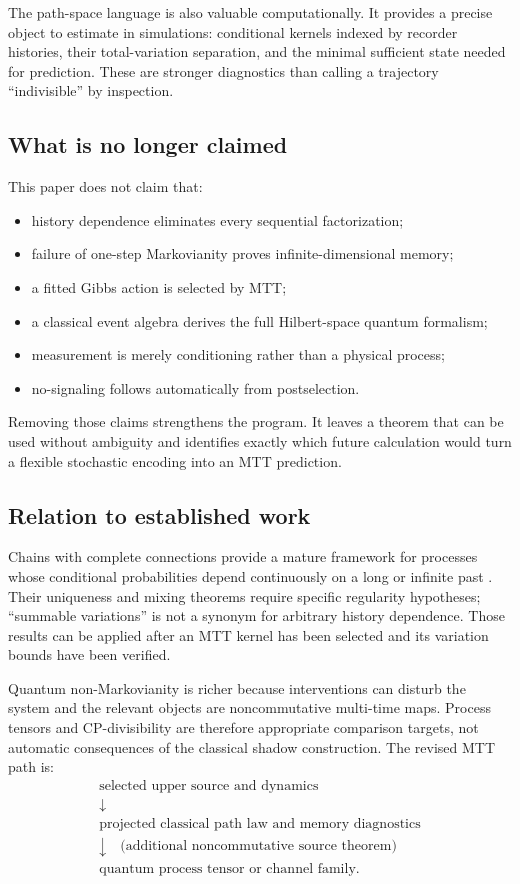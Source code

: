 \documentclass[11pt]{article}
\theoremstyle{definition}
\theoremstyle{remark}
\begin{document}
The path-space language is also valuable computationally.  It provides a
precise object to estimate in simulations: conditional kernels indexed by
recorder histories, their total-variation separation, and the minimal
sufficient state needed for prediction.  These are stronger diagnostics than
calling a trajectory ``indivisible'' by inspection.

\subsection{What is no longer claimed}

This paper does not claim that:
\begin{itemize}
\item history dependence eliminates every sequential factorization;
\item failure of one-step Markovianity proves infinite-dimensional memory;
\item a fitted Gibbs action is selected by MTT;
\item a classical event algebra derives the full Hilbert-space quantum
  formalism;
\item measurement is merely conditioning rather than a physical process;
\item no-signaling follows automatically from postselection.
\end{itemize}

Removing those claims strengthens the program.  It leaves a theorem that can
be used without ambiguity and identifies exactly which future calculation
would turn a flexible stochastic encoding into an MTT prediction.

\subsection{Relation to established work}

Chains with complete connections provide a mature framework for processes
whose conditional probabilities depend continuously on a long or infinite
past \cite{fernandez2005,johansson2003}.  Their uniqueness and mixing theorems
require specific regularity hypotheses; ``summable variations'' is not a
synonym for arbitrary history dependence.  Those results can be applied after
an MTT kernel has been selected and its variation bounds have been verified.

Quantum non-Markovianity is richer because interventions can disturb the
system and the relevant objects are noncommutative multi-time maps.  Process
tensors and CP-divisibility are therefore appropriate comparison targets, not
automatic consequences of the classical shadow construction.  The revised
MTT path is:
\[
\begin{array}{c}
\text{selected upper source and dynamics}\\
\downarrow\\
\text{projected classical path law and memory diagnostics}\\
\downarrow\quad\text{(additional noncommutative source theorem)}\\
\text{quantum process tensor or channel family}.
\end{array}
\]
\end{document}
